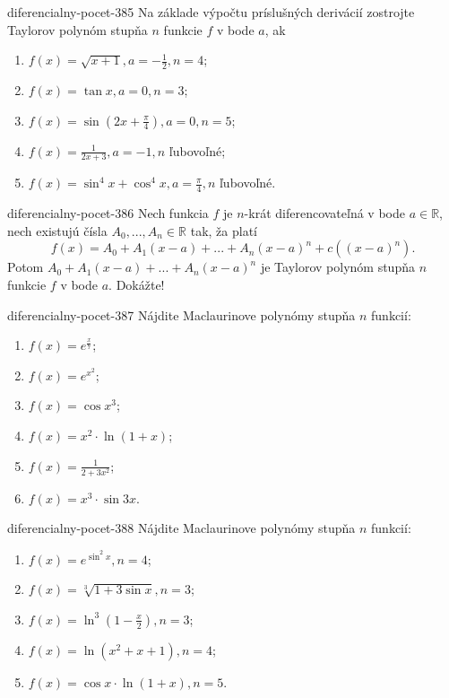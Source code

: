 \begin{defproblem}{diferencialny-pocet-385}
Na základe výpočtu príslušných derivácií zostrojte Taylorov polynóm stupňa $n$ funkcie $f$ v bode $a$, ak
\begin{enumerate}
\item $f(x)=\sqrt{x+1},a=-\frac{1}{2},n=4$;
\item $f(x)=\tan x,a=0,n=3$;
\item $f(x)=\sin (2x+\frac{\pi}{4}),a=0,n=5$;
\item $f(x)=\frac{1}{2x+3},a=-1,n$ ľubovoľné;
\item $f(x)=\sin^4 x+\cos^4 x,a=\frac{\pi}{4},n$ ľubovoľné.
\end{enumerate}
\end{defproblem}

\begin{defproblem}{diferencialny-pocet-386}
Nech funkcia $f$ je $n$-krát diferencovateľná v bode $a\in\mathbb{R}$, nech existujú čísla $A_0,...,A_n\in\mathbb{R}$ tak, ža platí
$$f(x)=A_0+A_1(x-a)+...+A_n(x-a)^n+c((x-a)^n).$$ Potom  $A_0+A_1(x-a)+...+A_n(x-a)^n$ je Taylorov polynóm stupňa $n$ funkcie $f$ v bode $a$. Dokážte!
\end{defproblem}

\begin{defproblem}{diferencialny-pocet-387}
Nájdite Maclaurinove polynómy stupňa $n$ funkcií:
\begin{multicols}{2}
\begin{enumerate}
    \item $f(x)=e^{\frac{x}{7}}$;
	\item $f(x)=e^{x^2}$;
	\item $f(x)=\cos x^3$;
	\item $f(x)=x^2\cdot\ln (1+x)$;
	\item $f(x)=\frac{1}{2+3x^2}$;
	\item $f(x)=x^3\cdot\sin 3x$.
\end{enumerate}
\end{multicols}
\end{defproblem}

\begin{defproblem}{diferencialny-pocet-388}
Nájdite Maclaurinove polynómy stupňa $n$ funkcií:
\begin{multicols}{2}
\begin{enumerate}
    \item $f(x)=e^{\sin^2 x},n=4$;
	\item $f(x)=\sqrt[3]{1+3\sin x},n=3$;
	\item $f(x)=\ln^3 (1-\frac{x}{2}),n=3$;
	\item $f(x)=\ln (x^2+x+1),n=4$;
	\item $f(x)=\cos x\cdot\ln (1+x),n=5$.
\end{enumerate}
\end{multicols}
\end{defproblem}

